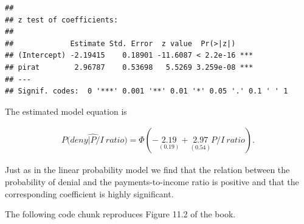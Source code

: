 \documentclass[]{book}
\theoremstyle{definition}
\theoremstyle{definition}
\theoremstyle{definition}
\theoremstyle{remark}
\begin{document}
\begin{verbatim}
## 
## z test of coefficients:
## 
##             Estimate Std. Error  z value  Pr(>|z|)    
## (Intercept) -2.19415    0.18901 -11.6087 < 2.2e-16 ***
## pirat        2.96787    0.53698   5.5269 3.259e-08 ***
## ---
## Signif. codes:  0 '***' 0.001 '**' 0.01 '*' 0.05 '.' 0.1 ' ' 1
\end{verbatim}

The estimated model equation is

\begin{align}
  \widehat{P(deny\vert P/I \ ratio}) = \Phi(-\underset{(0.19)}{2.19} + \underset{(0.54)}{2.97} P/I \ ratio). \label{eq:denyprobit}
\end{align}

Just as in the linear probability model we find that the relation
between the probability of denial and the payments-to-income ratio is
positive and that the corresponding coefficient is highly significant.

The following code chunk reproduces Figure 11.2 of the book.
\end{document}
